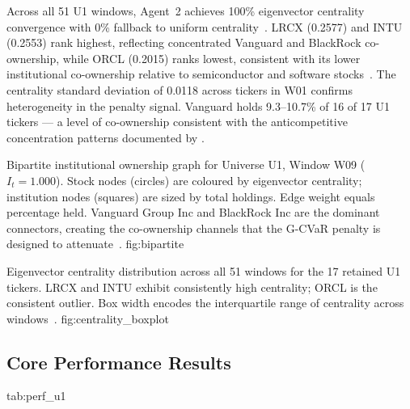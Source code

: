 Across all 51 U1 windows, Agent~2 achieves 100\% eigenvector centrality
convergence with 0\% fallback to uniform centrality~\citep{bonacich1987}.
LRCX (0.2577) and INTU (0.2553) rank highest, reflecting concentrated
Vanguard and BlackRock co-ownership, while ORCL (0.2015) ranks lowest,
consistent with its lower institutional co-ownership relative to
semiconductor and software stocks~\citep{azar2018,bebchuk2017}. The
centrality standard deviation of 0.0118 across tickers in W01 confirms
heterogeneity in the penalty signal. Vanguard holds 9.3--10.7\% of 16 of
17 U1 tickers — a level of co-ownership consistent with the anticompetitive
concentration patterns documented by \citet{azar2018}.

  {Bipartite institutional ownership graph for Universe U1, Window W09
   ($I_t = 1.000$). Stock nodes (circles) are coloured by eigenvector
   centrality; institution nodes (squares) are sized by total holdings.
   Edge weight equals percentage held. Vanguard Group Inc and BlackRock
   Inc are the dominant connectors, creating the co-ownership channels
   that the G-CVaR penalty is designed to
   attenuate~\citep{azar2018,billio2012}.}
  {fig:bipartite}

  {Eigenvector centrality distribution across all 51 windows for the
   17 retained U1 tickers. LRCX and INTU exhibit consistently high
   centrality; ORCL is the consistent outlier. Box width encodes the
   interquartile range of centrality across windows~\citep{bonacich1987}.}
  {fig:centrality_boxplot}

\subsection{Core Performance Results}

  {tab:perf_u1}
  {}

